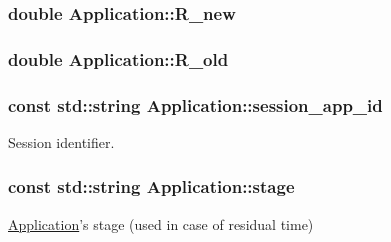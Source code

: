 \hypertarget{classApplication_a9e94824741ac0c52d0fa5ede30c72fa1}{
\subsubsection[{R\-\_\-new}]{\setlength{\rightskip}{0pt plus 5cm}double Application\-::\-R\-\_\-new\hspace{0.3cm}{\ttfamily [private]}}}\label{classApplication_a9e94824741ac0c52d0fa5ede30c72fa1}
\hypertarget{classApplication_a950cfc8da4a8e4640aee8d2840f53e0e}{
\subsubsection[{R\-\_\-old}]{\setlength{\rightskip}{0pt plus 5cm}double Application\-::\-R\-\_\-old\hspace{0.3cm}{\ttfamily [private]}}}\label{classApplication_a950cfc8da4a8e4640aee8d2840f53e0e}
\hypertarget{classApplication_a6152c40564d526b9b60871c98f7a51c7}{
\subsubsection[{session\-\_\-app\-\_\-id}]{\setlength{\rightskip}{0pt plus 5cm}const std\-::string Application\-::session\-\_\-app\-\_\-id\hspace{0.3cm}{\ttfamily [private]}}}\label{classApplication_a6152c40564d526b9b60871c98f7a51c7}


Session identifier. 

\hypertarget{classApplication_a27731ed4d16f6e9583b52c4f09a69258}{
\subsubsection[{stage}]{\setlength{\rightskip}{0pt plus 5cm}const std\-::string Application\-::stage\hspace{0.3cm}{\ttfamily [private]}}}\label{classApplication_a27731ed4d16f6e9583b52c4f09a69258}


\hyperlink{classApplication}{Application}'s stage (used in case of residual time) 

